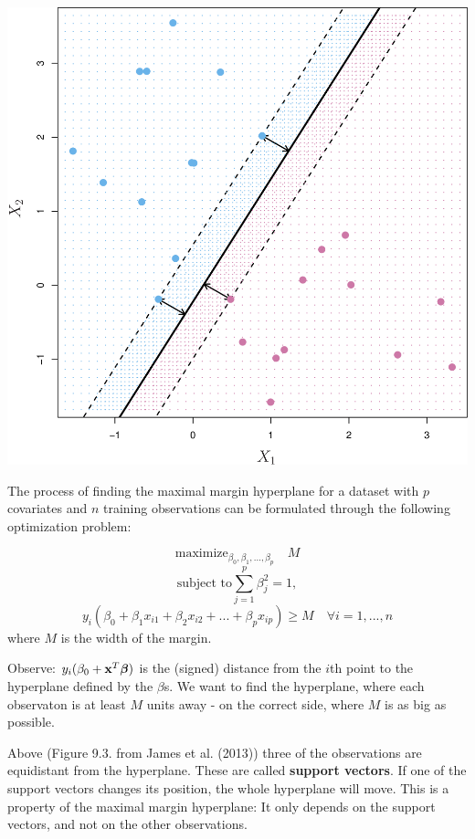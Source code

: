 \documentclass[ignorenonframetext,]{beamer}
\begin{document}
\begin{frame}

\includegraphics{../ISLR/Chapter9/9.3.png}

\end{frame}

\begin{frame}

The process of finding the maximal margin hyperplane for a dataset with
\(p\) covariates and \(n\) training observations can be formulated
through the following optimization problem:

\[\mathrm{maximize}_{\beta_0,\beta_1,...,\beta_p} \quad M \]
\[\text{subject to} \sum_{j=1}^p \beta_j^2=1,\]
\[y_i(\beta_0+\beta_1 x_{i1}+\beta_2 x_{i2}+...+\beta_p x_{ip})\geq M \quad  \forall i=1,...,n\]
where \(M\) is the width of the margin.

Observe: \(y_i(\beta_0+{\bf x}^T {\boldsymbol \beta})\) is the (signed)
distance from the \(i\)th point to the hyperplane defined by the
\(\beta\)s. We want to find the hyperplane, where each observaton is at
least \(M\) units away - on the correct side, where \(M\) is as big as
possible.

\end{frame}

\begin{frame}

Above (Figure 9.3. from James et al. (2013)) three of the observations
are equidistant from the hyperplane. These are called \textbf{support
vectors}. If one of the support vectors changes its position, the whole
hyperplane will move. This is a property of the maximal margin
hyperplane: It only depends on the support vectors, and not on the other
observations.

\end{frame}
\end{document}
